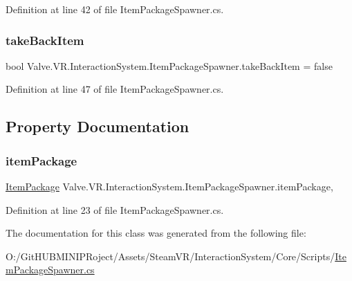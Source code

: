Definition at line 42 of file Item\+Package\+Spawner.\+cs.

\mbox{\label{class_valve_1_1_v_r_1_1_interaction_system_1_1_item_package_spawner_aefc74e62c39dfc6c5fd646dd8d18da61}} 
\subsubsection{\texorpdfstring{takeBackItem}{takeBackItem}}
{\footnotesize\ttfamily bool Valve.\+V\+R.\+Interaction\+System.\+Item\+Package\+Spawner.\+take\+Back\+Item = false}



Definition at line 47 of file Item\+Package\+Spawner.\+cs.



\subsection{Property Documentation}
\mbox{\label{class_valve_1_1_v_r_1_1_interaction_system_1_1_item_package_spawner_aac24719049cb41f6b3a553bb1add8714}} 
\subsubsection{\texorpdfstring{itemPackage}{itemPackage}}
{\footnotesize\ttfamily \mbox{\hyperlink{class_valve_1_1_v_r_1_1_interaction_system_1_1_item_package}{Item\+Package}} Valve.\+V\+R.\+Interaction\+System.\+Item\+Package\+Spawner.\+item\+Package\hspace{0.3cm}{\ttfamily [get]}, {\ttfamily [set]}}



Definition at line 23 of file Item\+Package\+Spawner.\+cs.



The documentation for this class was generated from the following file\+:\begin{DoxyCompactItemize}
\item 
O\+:/\+Git\+H\+U\+B\+M\+I\+N\+I\+P\+Roject/\+Assets/\+Steam\+V\+R/\+Interaction\+System/\+Core/\+Scripts/\mbox{\hyperlink{_item_package_spawner_8cs}{Item\+Package\+Spawner.\+cs}}\end{DoxyCompactItemize}

